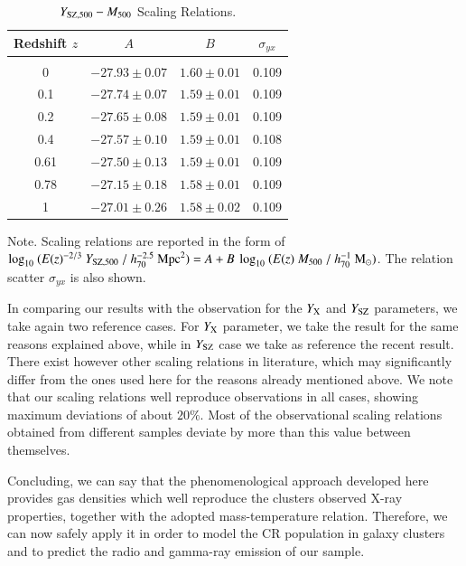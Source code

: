 \documentclass[traditabstract]{aa}
\newcommand{\rmn}{\mathrm}
\begin{document}
\begin{table}[hbt!]
\begin{center}
\caption{$Y_{\rm{SZ}, 500}-M_{500}$ Scaling Relations.}
\medskip
\begin{tabular}{cccc}
\hline
\phantom{\Big|}
Redshift $z$ & $A$ & $B$ & $\sigma_{yx}$ \\
\hline\\[-0.5em]
 0      & $-27.93\pm0.07$ & $1.60\pm0.01$ & 0.109\\
 0.1   & $-27.74\pm0.07$ & $1.59\pm0.01$ & 0.109\\
 0.2   & $-27.65\pm0.08$ & $1.59\pm0.01$ & 0.109\\ 
 0.4   & $-27.57\pm0.10$ & $1.59\pm0.01$ & 0.108\\ 
 0.61 & $-27.50\pm0.13$ & $1.59\pm0.01$ & 0.109\\ 
 0.78 & $-27.15\pm0.18$ & $1.58\pm0.01$ & 0.109\\ 
 1      & $-27.01\pm0.26$ & $1.58\pm0.02$ & 0.109\\[0.5em] 
\hline
\end{tabular}
\label{tab:YSZfits}
\end{center}
\footnotesize{Note. Scaling relations are reported in the form of $\log_{10}~(E(z)^{-2/3}~Y_{\rm{SZ},500}~/~h_{70}^{-2.5}~\rmn{Mpc}^{2})=A+B~\log_{10}~(E(z)~M_{500}~/~h_{70}^{-1}~\rmn{M_{\odot}})$. The relation scatter $\sigma_{yx}$ is also shown.}
\end{table}

In comparing our results with the observation for the $Y_{\rm{X}}$ and $Y_{\rm{SZ}}$ parameters, we take again two reference cases. For $Y_{\rm{X}}$ parameter, we take the \cite{2010MNRAS.406.1773M} result for the same reasons explained above, while in $Y_{\rm{SZ}}$ case we take as reference the recent \cite{2011A&A...536A..11P} result. There exist however other scaling relations in literature, which may significantly differ from the ones used here for the reasons already mentioned above. We note that our scaling relations well reproduce observations in all cases, showing maximum deviations of about $20\%$. Most of the observational scaling relations obtained from different samples deviate by more than this value between themselves.  

Concluding, we can say that the phenomenological approach developed here provides gas densities which well reproduce the clusters observed X-ray properties, together with the adopted mass-temperature relation. Therefore, we can now safely apply it in order to model the CR population in galaxy clusters and to predict the radio and gamma-ray emission of our sample.
\end{document}
